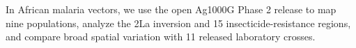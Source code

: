 \begingroup{}\endgroup%
In African malaria vectors, we use the open Ag1000G Phase 2 release to map nine populations, analyze the 2La inversion and 15 insecticide-resistance regions, and compare broad spatial variation with 11 released laboratory crosses.
